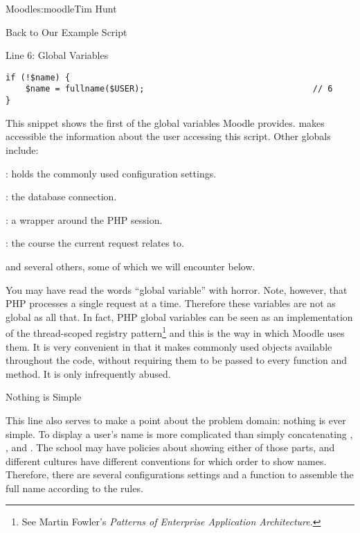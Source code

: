 \begin{aosachapter}{Moodle}{s:moodle}{Tim Hunt}
\begin{aosasect1}{Back to Our Example Script}
\begin{aosasect2}{Line 6: Global Variables}
\begin{verbatim}
if (!$name) {
    $name = fullname($USER);                                  // 6
}
\end{verbatim}

This snippet shows the first of the global variables Moodle
provides.  makes accessible the information about the
user accessing this script. Other globals include:

\begin{aosaitemize}

\item {}: holds the commonly used configuration settings.

\item {}: the database connection.

\item {}: a wrapper around the PHP session.

\item {}: the course the current request relates to.

\end{aosaitemize}

\noindent
and several others, some of which we will encounter below.

You may have read the words ``global variable'' with horror. Note,
however, that PHP processes a single request at a time. Therefore
these variables are not as global as all that. In fact, PHP global
variables can be seen as an implementation of the thread-scoped
registry pattern\footnote{See Martin Fowler's \emph{Patterns of
Enterprise Application Architecture}.} and this is the way in which
Moodle uses them. It is very convenient in that it makes commonly used
objects available throughout the code, without requiring them to be
passed to every function and method. It is only infrequently abused.

\end{aosasect2}

\begin{aosasect2}{Nothing is Simple}

This line also serves to make a point about the problem
domain: nothing is ever simple. To display a user's
name is more complicated than simply concatenating ,
, and . The school may have policies
about showing either of those parts, and different cultures have
different conventions for which order to show names. Therefore, there
are several configurations settings and a function to
assemble the full name according to the rules.


\end{aosasect2}
\end{aosasect1}
\end{aosachapter}
